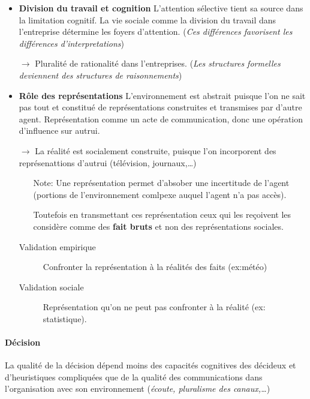\documentclass[11pt]{article} %
\begin{document}
\begin{itemize}

 \item \textbf{Division du travail et cognition} L'attention sélective
tient sa source dans la limitation cognitif. La vie sociale comme la
division du travail dans l'entreprise détermine les foyers d'attention.
(\textit{Ces différences favorisent les différences d'interpretations})

$\to$ Pluralité de rationalité dans l'entreprises. (\textit{Les
    structures formelles deviennent des structures de raisonnements})

 \item \textbf{Rôle des représentations} L'environnement est abstrait
puisque l'on ne sait pas tout et constitué de représentations
construites et transmises par d'autre agent.
Représentation comme un acte de communication, donc une opération
d'influence sur autrui. 

$\to$ La réalité est socialement construite, puisque l'on incorporent des
représenattions d'autrui (télévision, journaux,\ldots)

\begin{itemize}
    \item[Note:] Une représentation permet d'absober une incertitude de l'agent
    (portions de l'environnement comlpexe auquel l'agent n'a pas accès).

    Toutefois en transmettant ces représentation ceux qui les reçoivent les
    considère comme des \textbf{fait bruts} et non des représentations
    sociales.
\end{itemize}

	\begin{description}
		\item[Validation empirique] Confronter la représentation à la réalités des faits (ex:météo)
		\item[Validation sociale] Représentation qu'on ne peut pas confronter à la réalité 		
		(ex: statistique).
	\end{description}
\end{itemize}

\paragraph{Décision}
La qualité de la décision dépend moins des capacités cognitives des
décideux et d'heuristiques compliquées que de la qualité des
communications dans l'organisation avec son environnement
(\textit{écoute, pluralisme des canaux,\ldots})
\end{document}
